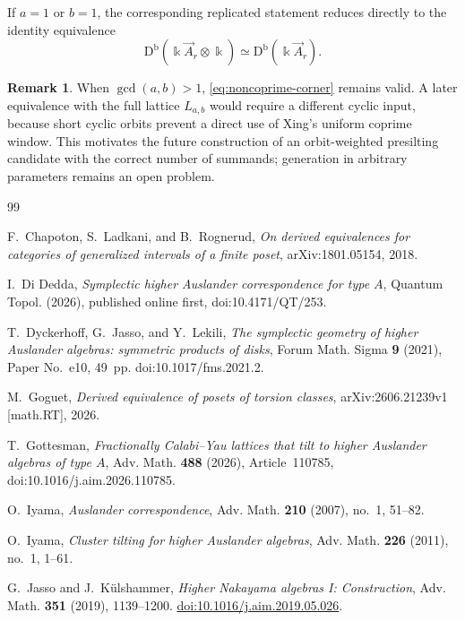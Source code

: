 \documentclass[12pt,a4paper,english,reqno]{amsart}
\theoremstyle{plain}
\theoremstyle{definition}
\newtheorem{remark}[theorem]{Remark}
\newcommand{\kk}{\Bbbk}
\newcommand{\Db}{\mathrm D^{\mathrm b}}
\begin{document}
If $a=1$ or $b=1$, the corresponding replicated statement reduces
directly to the identity equivalence
\[
 \Db(\kk\vec A_r\otimes\kk)
 \simeq
 \Db(\kk\vec A_r).
\]

\begin{remark}
When $\gcd(a,b)>1$, \eqref{eq:noncoprime-corner} remains valid.  A later
equivalence with the full lattice $L_{a,b}$ would require a different
cyclic input, because short cyclic orbits prevent a direct use of Xing's
uniform coprime window.  This motivates the future construction of an
orbit-weighted presilting candidate with the correct number of summands;
generation in arbitrary parameters remains an open problem.
\end{remark}



\begin{thebibliography}{99}

F.~Chapoton, S.~Ladkani, and B.~Rognerud,
\emph{On derived equivalences for categories of generalized intervals of a
finite poset},
arXiv:1801.05154, 2018.

I.~Di Dedda,
\emph{Symplectic higher Auslander correspondence for type $A$},
Quantum Topol. (2026), published online first,
doi:10.4171/QT/253.

T.~Dyckerhoff, G.~Jasso, and Y.~Lekili,
\emph{The symplectic geometry of higher Auslander algebras: symmetric
products of disks},
Forum Math. Sigma \textbf{9} (2021), Paper No.~e10, 49~pp.
doi:10.1017/fms.2021.2.

M.~Goguet,
\emph{Derived equivalence of posets of torsion classes},
arXiv:2606.21239v1 [math.RT], 2026.

T.~Gottesman,
\emph{Fractionally Calabi--Yau lattices that tilt to higher Auslander
algebras of type $A$},
Adv. Math. \textbf{488} (2026), Article~110785,
doi:10.1016/j.aim.2026.110785.

O.~Iyama,
\emph{Auslander correspondence},
Adv. Math. \textbf{210} (2007), no.~1, 51--82.

O.~Iyama,
\emph{Cluster tilting for higher Auslander algebras},
Adv. Math. \textbf{226} (2011), no.~1, 1--61.

G.~Jasso and J.~K\"ulshammer,
\emph{Higher Nakayama algebras I: Construction},
Adv. Math. \textbf{351} (2019), 1139--1200.
\href{https://doi.org/10.1016/j.aim.2019.05.026}
{doi:10.1016/j.aim.2019.05.026}.




\end{thebibliography}
\end{document}

